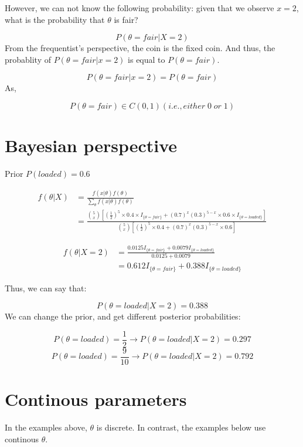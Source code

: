 \documentclass[
]{book}
\begin{document}
However, we can not know the following probability: given that we observe \(x=2\), what is the probability that \(\theta\) is fair?

\[P(\theta=fair | X=2)\]
From the frequentist's perspective, the coin is the fixed coin. And thus, the probablity of \(P(\theta=fair|x=2)\) is equal to \(P(\theta=fair)\).

\[P(\theta=fair|x=2)=P(\theta=fair)\]
As,

\[P(\theta=fair) \in C(0,1) (i.e., either \; 0 \; or \; 1)\]

\hypertarget{bayesian-perspective}{%
\section{Bayesian perspective}\label{bayesian-perspective}}

Prior \(P(loaded)=0.6\)

\[\begin{aligned} f(\theta | X) &= \frac{f(x|\theta) f(\theta)}{\sum_{\theta} f(x|\theta)f(\theta)} \\ &=\frac{\binom{5}{x} [(\frac{1}{2})^5 \times 0.4 \times I_{\{\theta=fair \}}+ (0.7)^x(0.3)^{5-x} \times 0.6 \times I_{\{\theta=loaded \}}]}{\binom{5}{x} [(\frac{1}{2})^5 \times 0.4 + (0.7)^x(0.3)^{5-x} \times 0.6]}  \end{aligned}\]

\[\begin{aligned} f(\theta |X=2) &=\frac{0.0125 I_{\{\theta=fair \}}+0.0079 I_{\{\theta=loaded \}} }{0.0125+0.0079} \\ &= 0.612 I_{\{\theta=fair \}} + 0.388 I_{\{\theta=loaded \}} \end{aligned}\]

Thus, we can say that:

\[P(\theta=loaded | X=2)=0.388\]
We can change the prior, and get different posterior probabilities:

\[P(\theta=loaded)=\frac{1}{2} \rightarrow P(\theta=loaded | X=2)=0.297\]
\[P(\theta=loaded)=\frac{9}{10} \rightarrow P(\theta=loaded | X=2)=0.792\]

\hypertarget{continous-parameters}{%
\section{Continous parameters}\label{continous-parameters}}

In the examples above, \(\theta\) is discrete. In contrast, the examples below use continous \(\theta\).
\end{document}
